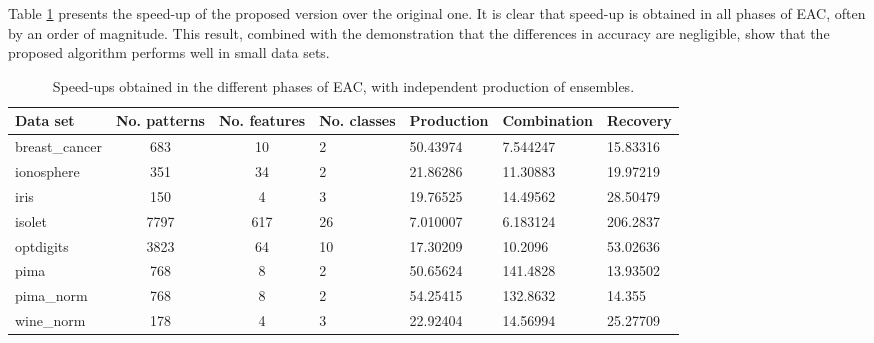 
Table \ref{tab:validation speedup all} presents the speed-up of the proposed version over the original one.
It is clear that speed-up is obtained in all phases of EAC, often by an order of magnitude.
This result, combined with the demonstration that the differences in accuracy are negligible, show that the proposed algorithm performs well in small data sets.

\begin{table}[h]
\centering
\caption{Speed-ups obtained in the different phases of EAC, with independent production of ensembles.}

\begin{tabular}{lccllll}
\toprule
Data set &  No. patterns &  No. features & No. classes & Production & Combination & Recovery \\
\midrule
breast\_cancer &           683 &            10 &           2 &      50.43974 &   7.544247 &        15.83316 \\
ionosphere    &           351 &            34 &           2 &      21.86286 &   11.30883 &        19.97219 \\
iris          &           150 &             4 &           3 &      19.76525 &   14.49562 &        28.50479 \\
isolet        &          7797 &           617 &          26 &      7.010007 &   6.183124 &        206.2837 \\
optdigits     &          3823 &            64 &          10 &      17.30209 &    10.2096 &        53.02636 \\
pima          &           768 &             8 &           2 &      50.65624 &   141.4828 &        13.93502 \\
pima\_norm     &           768 &             8 &           2 &      54.25415 &   132.8632 &          14.355 \\
wine\_norm     &           178 &             4 &           3 &      22.92404 &   14.56994 &        25.27709 \\
\bottomrule
\end{tabular}

\label{tab:validation speedup all}
\end{table}




%
%

